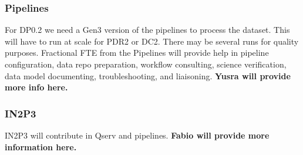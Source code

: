 \subsubsection{ Pipelines }
For DP0.2 we need a Gen3 version of the pipelines to process the dataset. This will have to run at scale for PDR2 or DC2. There may be several runs for quality purposes.
Fractional FTE from the Pipelines will provide help in pipeline configuration, data repo preparation, workflow consulting, science verification, data model documenting, troubleshooting, and liaisoning.
{\bf Yusra will provide more info here.}

\subsubsection{ IN2P3}
IN2P3 will contribute in Qserv and pipelines. {\bf Fabio will provide more information here.}
